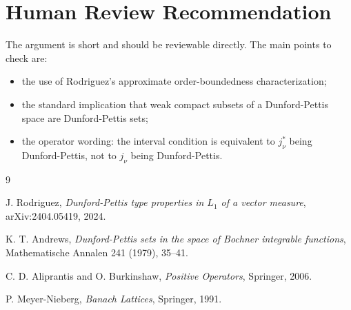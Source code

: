 \documentclass[11pt]{amsart}
\begin{document}
\section*{Human Review Recommendation}

The argument is short and should be reviewable directly.  The main points to
check are:
\begin{itemize}
\item the use of Rodriguez's approximate order-boundedness characterization;
\item the standard implication that weak compact subsets of a Dunford-Pettis
      space are Dunford-Pettis sets;
\item the operator wording: the interval condition is equivalent to
      $j_\nu^*$ being Dunford-Pettis, not to $j_\nu$ being Dunford-Pettis.
\end{itemize}

\begin{thebibliography}{9}

J. Rodriguez,
\emph{Dunford-Pettis type properties in $L_1$ of a vector measure},
arXiv:2404.05419, 2024.

K. T. Andrews,
\emph{Dunford-Pettis sets in the space of Bochner integrable functions},
Mathematische Annalen 241 (1979), 35--41.

C. D. Aliprantis and O. Burkinshaw,
\emph{Positive Operators},
Springer, 2006.

P. Meyer-Nieberg,
\emph{Banach Lattices},
Springer, 1991.

\end{thebibliography}
\end{document}
